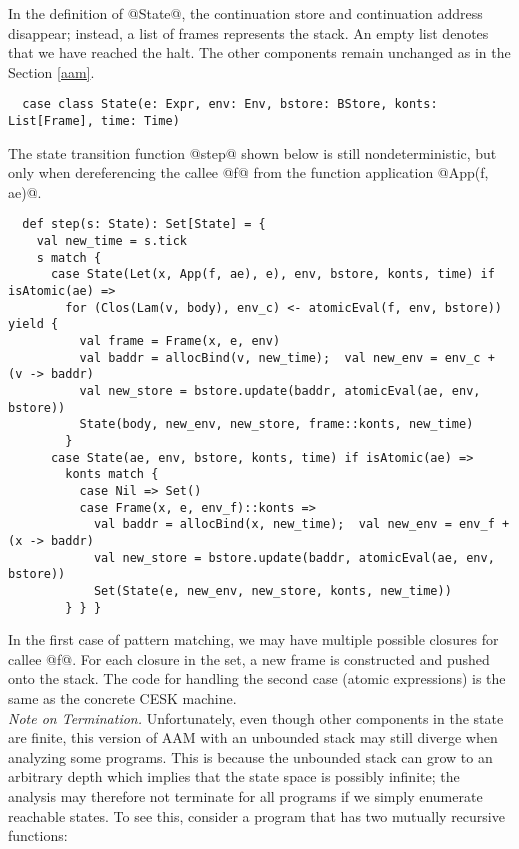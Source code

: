 \documentclass[acmsmall, screen]{acmart}\settopmatter{}
\begin{document}
In the definition of @State@, the continuation store and continuation address disappear;
instead, a list of frames represents the stack. An empty list denotes that we have reached
the halt. The other components remain unchanged as in the Section \ref{aam}.

\begin{lstlisting}
  case class State(e: Expr, env: Env, bstore: BStore, konts: List[Frame], time: Time)
\end{lstlisting}

The state transition function @step@ shown below is still nondeterministic, but only when 
dereferencing the callee @f@ from the function application @App(f, ae)@.

\begin{lstlisting}
  def step(s: State): Set[State] = {
    val new_time = s.tick
    s match {
      case State(Let(x, App(f, ae), e), env, bstore, konts, time) if isAtomic(ae) =>
        for (Clos(Lam(v, body), env_c) <- atomicEval(f, env, bstore)) yield {
          val frame = Frame(x, e, env)
          val baddr = allocBind(v, new_time);  val new_env = env_c + (v -> baddr)
          val new_store = bstore.update(baddr, atomicEval(ae, env, bstore))
          State(body, new_env, new_store, frame::konts, new_time)
        }
      case State(ae, env, bstore, konts, time) if isAtomic(ae) =>
        konts match {
          case Nil => Set()
          case Frame(x, e, env_f)::konts =>
            val baddr = allocBind(x, new_time);  val new_env = env_f + (x -> baddr)
            val new_store = bstore.update(baddr, atomicEval(ae, env, bstore))
            Set(State(e, new_env, new_store, konts, new_time))
        } } }
\end{lstlisting}

In the first case of pattern matching, we may have multiple possible closures for callee @f@.
For each closure in the set, a new frame is constructed and pushed onto the stack.
The code for handling the second case (atomic expressions) is the same as the concrete CESK machine. \\

\textit{Note on Termination.}
Unfortunately, even though other components in the state are finite, this version of AAM with an unbounded
stack may still diverge when analyzing some programs.
This is because the unbounded stack can grow to an arbitrary depth which implies that the state
space is possibly infinite; the analysis may therefore not terminate for all programs if we
simply enumerate reachable states. To see this, consider a program that has two mutually
recursive functions:
\end{document}
